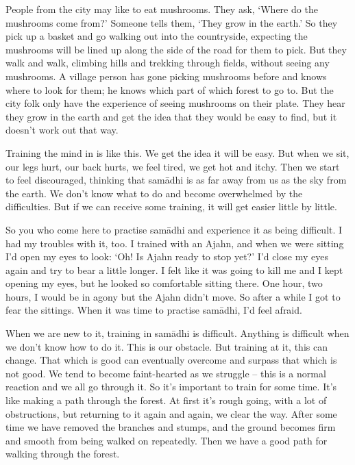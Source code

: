 People from the city may like to eat mushrooms. They ask, `Where do the mushrooms come from?' Someone tells them, `They grow in the earth.' So they pick up a basket and go walking out into the countryside, expecting the mushrooms will be lined up along the side of the road for them to pick. But they walk and walk, climbing hills and trekking through fields, without seeing any mushrooms. A village person has gone picking mushrooms before and knows where to look for them; he knows which part of which forest to go to. But the city folk only have the experience of seeing mushrooms on their plate. They hear they grow in the earth and get the idea that they would be easy to find, but it doesn't work out that way. 

Training the mind in  is like this. We get the idea it will be easy. But when we sit, our legs hurt, our back hurts, we feel tired, we get hot and itchy. Then we start to feel discouraged, thinking that sam\=adhi is as far away from us as the sky from the earth. We don't know what to do and become overwhelmed by the difficulties. But if we can receive some training, it will get easier little by little. 

So you who come here to practise sam\=adhi and experience it as being difficult. I had my troubles with it, too. I trained with an Ajahn, and when we were sitting I'd open my eyes to look: `Oh! Is Ajahn ready to stop yet?' I'd close my eyes again and try to bear a little longer. I felt like it was going to kill me and I kept opening my eyes, but he looked so comfortable sitting there. One hour, two hours, I would be in agony but the Ajahn didn't move. So after a while I got to fear the sittings. When it was time to practise sam\=adhi, I'd feel afraid. 

When we are new to it, training in sam\=adhi is difficult. Anything is difficult when we don't know how to do it. This is our obstacle. But \mbox{training} at it, this can change. That which is good can eventually overcome and surpass that which is not good. We tend to become faint-hearted as we struggle -- this is a normal reaction and we all go through it. So it's important to train for some time. It's like making a path through the forest. At first it's rough going, with a lot of obstructions, but returning to it again and again, we clear the way. After some time we have removed the branches and stumps, and the ground becomes firm and smooth from being walked on repeatedly. Then we have a good path for walking through the forest. 


